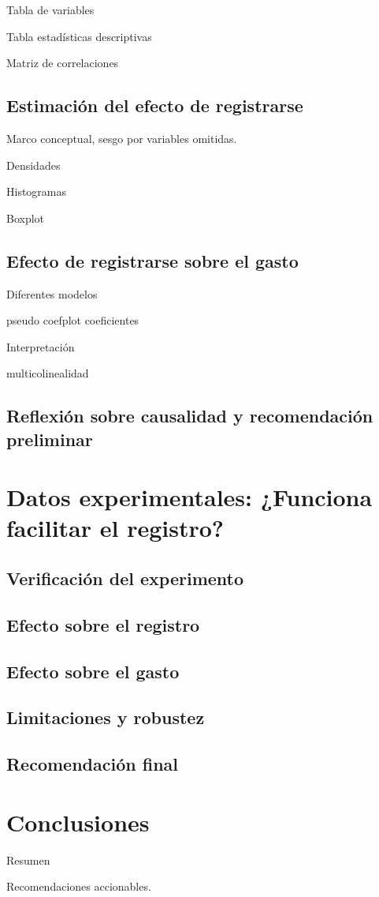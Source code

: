 \documentclass[conference]{IEEEtran}
\begin{document}
Tabla de variables 

Tabla estadísticas descriptivas

Matriz de correlaciones

\subsection{Estimación del efecto de registrarse}

Marco conceptual, sesgo por variables omitidas.


Densidades

Histogramas

Boxplot

\subsection{Efecto de registrarse sobre el gasto}


Diferentes modelos

pseudo coefplot coeficientes

Interpretación

multicolinealidad


\subsection{Reflexión sobre causalidad y recomendación preliminar}


\section{Datos experimentales: ¿Funciona facilitar el registro?}

\subsection{Verificación del experimento}

\subsection{Efecto sobre el registro}

\subsection{Efecto sobre el gasto}

\subsection{Limitaciones y robustez}

\subsection{Recomendación final}

\section{Conclusiones}

Resumen 

Recomendaciones accionables.
\end{document}
